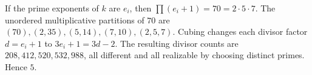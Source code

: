 If the prime exponents of $k$ are $e_i$, then $\prod(e_i+1)=70=2\cdot5\cdot7$. The unordered multiplicative partitions of $70$ are $(70),(2,35),(5,14),(7,10),(2,5,7)$. Cubing changes each divisor factor $d=e_i+1$ to $3e_i+1=3d-2$. The resulting divisor counts are $208,412,520,532,988$, all different and all realizable by choosing distinct primes. Hence $\boxed5$.
